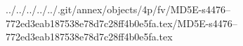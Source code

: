 ../../../../../.git/annex/objects/4p/fv/MD5E-s4476--772ed3eab187538e78d7c28ff4b0e5fa.tex/MD5E-s4476--772ed3eab187538e78d7c28ff4b0e5fa.tex